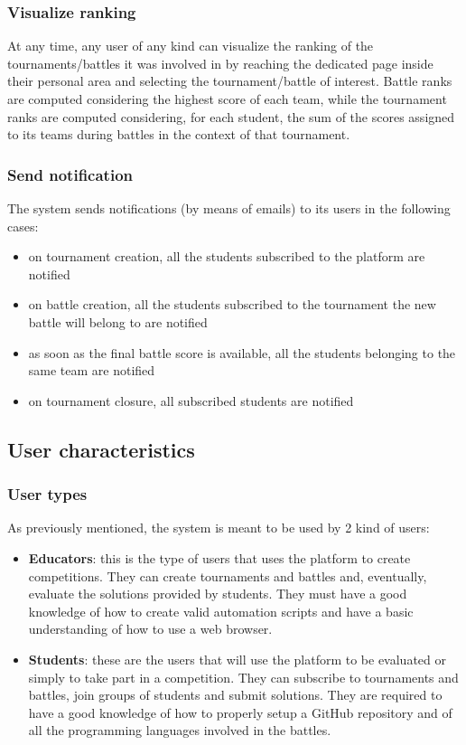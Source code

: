 \subsubsection{Visualize ranking}
At any time, any user of any kind can visualize the ranking of the tournaments/battles it was involved in by reaching the dedicated page inside their personal area and selecting the tournament/battle of interest. Battle ranks are computed considering the highest score of each team, while the tournament ranks are computed considering, for each student, the sum of the scores assigned to its teams during battles in the context of that tournament.
\subsubsection{Send notification}
The system sends notifications (by means of emails) to its users in the following cases:
\begin{itemize}
    \item on tournament creation, all the students subscribed to the platform are notified
    \item on battle creation, all the students subscribed to the tournament the new battle will belong to are notified
    \item as soon as the final battle score is available, all the students belonging to the same team are notified
    \item on tournament closure, all subscribed students are notified
\end{itemize}

\subsection{User characteristics}
\subsubsection{User types}
As previously mentioned, the system is meant to be used by 2 kind of users:
\begin{itemize}
    \item \textbf{Educators}: this is the type of users that uses the platform to create competitions. They can create tournaments and battles and, eventually, evaluate the solutions provided by students. They must have a good knowledge of how to create valid automation scripts and have a basic understanding of how to use a web browser.
    \item \textbf{Students}: these are the users that will use the platform to be evaluated or simply to take part in a competition. They can subscribe to tournaments and battles, join groups of students and submit solutions. They are required to have a good knowledge of how to properly setup a GitHub repository and of all the programming languages involved in the battles.
\end{itemize} 
